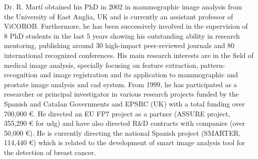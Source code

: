 Dr. R. Mart\'i obtained his PhD in 2002 in mammographic image analysis from the University of East Anglia, UK and is currently an assistant professor of ViCOROB.
Furthermore, he has been successively involved in the supervision of 8 PhD students in the last 5 years showing his outstanding ability in research mentoring, publishing around 30 high-impact peer-reviewed journals and 80 international recognized conferences.
His main research interests are in the field of medical image analysis, specially focusing on feature extraction, pattern-recognition and image registration and its application to mammographic and prostate image analysis and \ac{cad} system.
From 1999, he has participated as a researcher or principal investigator in various research projects funded by the Spanish and Catalan Governments and EPSRC (UK) with a total funding over 700,000 \euro{}.
He directed an EU FP7 project as a partner (ASSURE project, 355,290 \euro{} for \ac{udg}) and have also directed R\&D contracts with companies (over 50,000 \euro{}).
He is currently directing the national Spanish project (SMARTER, 114,440 \euro{}) which is related to the development of smart image analysis tool for the detection of breast cancer.





